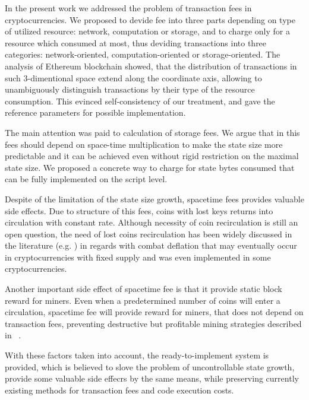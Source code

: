 \documentclass[]{llncs}   %
\begin{document}
In the present work we addressed the problem of transaction fees in cryptocurrencies.
We proposed to devide fee into three parts depending on type of utilized resource:
network, computation or storage, and to charge only for a resource which
consumed at most, thus deviding transactions into three categories: network-oriented,
computation-oriented or storage-oriented. The analysis of Ethereum blockchain showed,
that the distribution of transactions in such 3-dimentional space extend along the
coordinate axis, allowing to unambiguously distinguish transactions by their
type of the resource consumption. This evinced self-consistency of our treatment,
and gave the reference parameters for possible implementation.


The main attention was paid to calculation of storage fees. We argue that in
this fees should depend on space-time multiplication to make the state size
more predictable and it can be achieved even without rigid restriction on the
maximal state size. We proposed a concrete way to charge for state bytes consumed
that can be fully implemented on the script level.

Despite of the limitation of the state size growth, spacetime fees provides valuable side effects.
Due to structure of this fees, coins with lost keys returns into circulation with constant rate.
Although necessity of coin recirculation is still an open question, the need of lost coins recirculation
has been widely discussed in the literature (e.g. \cite{gjermundrod2014recirculating,gjermundrod2016going})
in regards with combat deflation that may eventually occur in cryptocurrencies with fixed supply and
was even implemented in some cryptocurrencies\cite{freicoin}.

Another important side effect of spacetime fee is that it provide static block reward
for miners. Even when a predetermined number of coins will enter a circulation,
spacetime fee will provide reward for miners, that does not depend on transaction
fees, preventing destructive but profitable mining strategies described in
~\cite{carlsten2016instability}.

With these factors taken into account, the ready-to-implement system is provided,
which is believed to slove the problem of uncontrollable state growth, provide some
valuable side effecrs by the same means, while preserving currently existing
methods for transaction fees and code execution costs.
\end{document}

